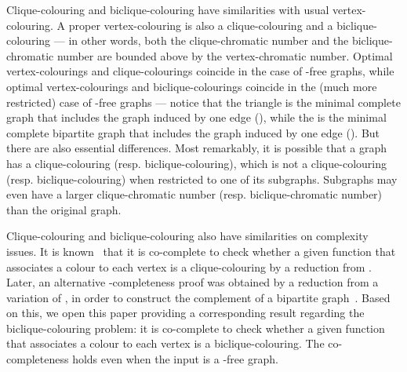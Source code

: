 \documentclass{article}
\begin{document}
Clique-colouring and biclique-colouring
have similarities with usual vertex-colouring. A proper vertex-colouring is also
a clique-colouring and a biclique-colouring --- in other words, both the
clique-chromatic number and the biclique-chromatic number are bounded above by
the vertex-chromatic number. Optimal vertex-colourings and clique-colourings
coincide in the case of -free graphs, while optimal vertex-colourings and
biclique-colourings coincide in the (much more restricted) case of
-free graphs --- notice that the triangle  is the minimal
complete graph that includes the graph induced by one edge (), while the
 is the minimal complete bipartite graph that includes the graph
induced by one edge (). But there are also essential differences. Most
remarkably, it is possible that a graph has a clique-colouring (resp.
biclique-colouring), which is not a clique-colouring (resp.
biclique-colouring) when restricted to one of its subgraphs.
Subgraphs may even have a larger clique-chromatic number (resp.
biclique-chromatic number) than the original graph. 

Clique-colouring and biclique-colouring also have similarities on complexity issues. 
It is known~\cite{Bacso} that it is co-complete
to check whether a given function that associates a colour to each vertex is a clique-colouring
by a reduction from . Later, an alternative -completeness
proof was obtained by a reduction from a variation of , in order to
construct the complement of a bipartite graph~\cite{Defossez}. Based on this, we open this
paper providing a corresponding result regarding the biclique-colouring problem:
it is co-complete to check whether a given function that associates 
a colour to each vertex is a biclique-colouring. The
co-completeness holds even when the input is a -free
graph.
\end{document}
